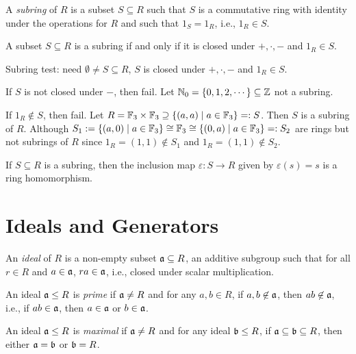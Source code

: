 \begin{definition}
    A \emph{subring} of $R$ is a subset $S \subseteq R$ such that $S$ is a commutative ring with identity under the operations for $R$ and such that $1_S = 1_R$, i.e., $1_R \in S$.
\end{definition}

\begin{fact}
    A subset $S \subseteq R$ is a subring if and only if it is closed under $+,\cdot,-$ and $1_R \in S$.
\end{fact}

\begin{example}
    Subring test: need $\emptyset \neq S \subseteq R$, $S$ is closed under $+,\cdot,-$ and $1_R \in S$. \par
    If $S$ is not closed under $-$, then fail. Let $\mathbb{N}_0 = \{0,1,2,\cdots\} \subseteq \mathbb{Z}$ not a subring. \par
    If $1_R \not \in S$, then fail. Let $R = \mathbb{F}_3 \times \mathbb{F}_3 \supseteq \{(a,a) \mid a \in \mathbb{F}_3\} =: S$. Then $S$ is a subring of $R$. Although $S_1 := \{(a,0) \mid a \in \mathbb{F}_3\} \cong \mathbb{F}_3 \cong \{(0,a) \mid a \in \mathbb{F}_3\} =: S_2$ are rings but not subrings of $R$ since $1_R = (1,1) \not \in S_1$ and $1_R = (1,1) \not \in S_2$. 
\end{example}

\begin{fact}
    If $S \subseteq R$ is a subring, then the inclusion map $\varepsilon: S \to R$ given by $\varepsilon(s) = s$ is a ring homomorphism.
\end{fact}

\section*{Ideals and Generators}

\begin{definition}
    An \emph{ideal} of $R$ is a non-empty subset $\mathfrak{a} \subseteq R$, an additive subgroup such that for all $r \in R$ and $a \in \mathfrak{a}$, $ra \in \mathfrak{a}$, i.e., closed under scalar multiplication. \par
    An ideal $\mathfrak{a} \leq R$ is \emph{prime} if $\mathfrak{a} \neq R$ and for any $a,b \in R$, if $a,b \not \in \mathfrak{a}$, then $ab \not \in \mathfrak{a}$, i.e., if $ab \in \mathfrak{a}$, then $a \in \mathfrak{a}$ or $b \in \mathfrak{a}$. \par
    An ideal $\mathfrak{a} \leq R$ is \emph{maximal} if $\mathfrak{a} \neq R$ and for any ideal $\mathfrak{b} \leq R$, if $\mathfrak{a} \subseteq \mathfrak{b} \subseteq R$, then either $\mathfrak{a} = \mathfrak{b}$ or $\mathfrak{b} = R$.
\end{definition}

